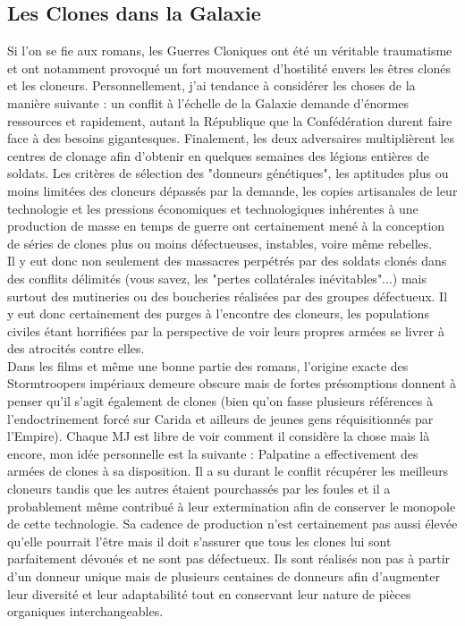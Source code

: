\documentclass[twoside]{article}
\begin{document}
\subsection{Les Clones dans la Galaxie}
Si l'on se fie aux romans, les Guerres Cloniques ont été un véritable traumatisme et ont notamment provoqué un fort mouvement d'hostilité envers les êtres clonés et les cloneurs. Personnellement, j'ai tendance à considérer les choses de la manière suivante : un conflit à l'échelle de la Galaxie demande d'énormes ressources et rapidement, autant la République que la Confédération durent faire face à des besoins gigantesques. Finalement, les deux adversaires multiplièrent les centres de clonage afin d'obtenir en quelques semaines des légions entières de soldats. Les critères de sélection des "donneurs génétiques", les aptitudes plus ou moins limitées des cloneurs dépassés par la demande, les copies artisanales de leur technologie et les pressions économiques et technologiques inhérentes à une production de masse en temps de guerre ont certainement mené à la conception de séries de clones plus ou moins défectueuses, instables, voire même rebelles.\\

Il y eut donc non seulement des massacres perpétrés par des soldats clonés dans des conflits délimités (vous savez, les "pertes collatérales inévitables"...) mais surtout des mutineries ou des boucheries réalisées par des groupes défectueux.  Il y eut donc certainement des purges à l'encontre des cloneurs, les populations civiles étant horrifiées par la perspective de voir leurs propres armées se livrer à des atrocités contre elles.\\

Dans les films et même une bonne partie des romans, l'origine exacte des Stormtroopers impériaux demeure obscure mais de fortes présomptions donnent à penser qu'il s'agit également de clones (bien qu'on fasse plusieurs références à l'endoctrinement forcé sur Carida et ailleurs de jeunes gens réquisitionnés par l'Empire). Chaque MJ est libre de voir comment il considère la chose mais là encore, mon idée personnelle est la suivante : Palpatine a effectivement des armées de clones à sa disposition. Il a su durant le conflit récupérer les meilleurs cloneurs tandis que les autres étaient pourchassés par les foules et il a probablement même contribué à leur extermination afin de conserver le monopole de cette technologie. Sa cadence de production n'est certainement pas aussi élevée qu'elle pourrait l'être mais il doit s'assurer que tous les clones lui sont parfaitement dévoués et ne sont pas défectueux. Ils sont réalisés non pas à partir d'un donneur unique mais de plusieurs centaines de donneurs afin d'augmenter leur diversité et leur adaptabilité tout en conservant leur nature de pièces organiques interchangeables.\\
\end{document}
